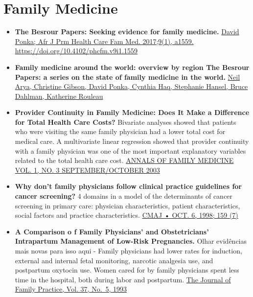 \documentclass[]{book}
\begin{document}
\hypertarget{family-medicine}{%
\section*{Family Medicine}\label{family-medicine}}

\begin{itemize}
\item
  \textbf{The Besrour Papers: Seeking evidence for family medicine.} \href{https://phcfm.org/index.php/phcfm/article/view/1559/2228}{David Ponka; Afr J Prm Health Care Fam Med. 2017;9(1), a1559. https://doi.org/10.4102/phcfm.v9i1.1559}
\item
  \textbf{Family medicine around the world: overview by region The Besrour Papers: a series on the state of family medicine in the world.} \href{https://www.ncbi.nlm.nih.gov/pmc/articles/PMC5471080/pdf/0630436.pdf}{Neil Arya, Christine Gibson, David Ponka, Cynthia Haq, Stephanie Hansel, Bruce Dahlman, Katherine Rouleau}
\item
  \textbf{Provider Continuity in Family Medicine: Does It Make a Difference for Total Health Care Costs?} Bivariate analyses showed that patients who were visiting the same family physician had a lower total cost for medical care. A multivariate linear regression showed that provider continuity with a family physician was one of the most important explanatory variables related to the total health care cost. \href{https://www.ncbi.nlm.nih.gov/pmc/articles/PMC1466579/pdf/0010144.pdf}{ANNALS OF FAMILY MEDICINE VOL. 1, NO. 3 SEPTEMBER/OCTOBER 2003}
\item
  \textbf{Why don't family physicians follow clinical practice guidelines for cancer screening?} 4 domains in a model of the determinants of cancer screening in primary care: physician characteristics, patient characteristics, social factors and practice characteristics. \href{https://www.ncbi.nlm.nih.gov/pmc/articles/PMC1232738/pdf/cmaj_159_7_797.pdf}{CMAJ • OCT. 6, 1998; 159 (7)}
\item
  \textbf{A Comparison o f Family Physicians' and Obstetricians' Intrapartum Management of Low-Risk Pregnancies.} Olhar evidências mais novas para isso aqui - Family physicians had lower rates for induction, external and internal fetal monitoring, narcotic analgesia use, and postpartum oxytocin use. Women cared for by family physicians spent less time in the hospital, both during labor and postpartum. \href{https://mdedge-files-live.s3.us-east-2.amazonaws.com/files/s3fs-public/jfp-archived-issues/1993-volume_36-37/JFP_1993-11_v37_i5_a-comparison-of-family-physicians-and-o.pdf}{The Journal of Family Practice, Vol. 37, No.~5, 1993}

\end{itemize}
\end{document}

